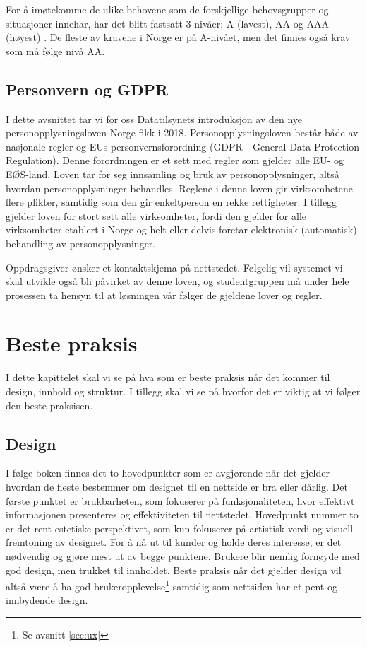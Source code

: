 For å imøtekomme de ulike behovene som de forskjellige behovsgrupper og situasjoner innehar, har det blitt fastsatt 3 nivåer; A (lavest), AA og AAA (høyest) \cite{w3c2008wca}. De fleste av kravene i Norge er på A-nivået, men det finnes også krav som må følge nivå AA.

\subsection{Personvern og GDPR}
I dette avsnittet tar vi for oss Datatilsynets \cite{data2018opm} introduksjon av den nye personopplysningsloven Norge fikk i 2018. Personopplysningsloven består både av nasjonale regler og EUs personvernsforordning (GDPR - General Data Protection Regulation). Denne forordningen er et sett med regler som gjelder alle EU- og EØS-land. Loven tar for seg innsamling og bruk av personopplysninger, altså hvordan personopplysninger behandles. Reglene i denne loven gir virksomhetene flere plikter, samtidig som den gir enkeltperson en rekke rettigheter. I tillegg gjelder loven for stort sett alle virksomheter, fordi den gjelder for alle virksomheter etablert i Norge og helt eller delvis foretar elektronisk (automatisk) behandling av personopplysninger. 

Oppdragsgiver ønsker et kontaktskjema på nettstedet. Følgelig vil systemet vi skal utvikle også bli påvirket av denne loven, og studentgruppen må under hele prosessen ta hensyn til at løsningen vår følger de gjeldene lover og regler.

\section{Beste praksis}

I dette kapittelet skal vi se på hva som er beste praksis når det kommer til design, innhold og struktur. I tillegg skal vi se på hvorfor det er viktig at vi følger den beste praksisen.

\subsection{Design}
\label{sec:design}
I følge boken  \cite[s.~5]{beaird2014tpo} finnes det to hovedpunkter som er avgjørende når det gjelder hvordan de fleste bestemmer om designet til en nettside er bra eller dårlig. Det første punktet er brukbarheten, som fokuserer på funksjonaliteten, hvor effektivt informasjonen presenteres og effektiviteten til nettstedet. Hovedpunkt nummer to er det rent estetiske perspektivet, som kun fokuserer på artistisk verdi og visuell fremtoning av designet. For å nå ut til kunder og holde deres interesse, er det nødvendig og gjøre mest ut av begge punktene. Brukere blir nemlig fornøyde med god design, men trukket til innholdet.  Beste praksis når det gjelder design vil altså være å ha god brukeropplevelse\footnote{Se avsnitt \ref{sec:ux}} samtidig som nettsiden har et pent og innbydende design.

